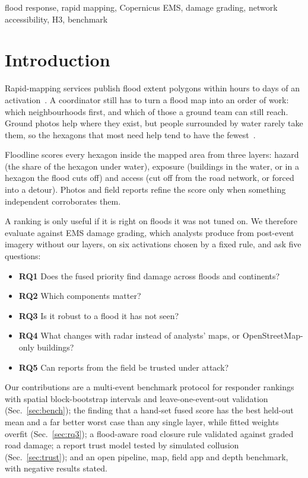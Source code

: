 \documentclass[conference]{IEEEtran}
\begin{document}
\begin{IEEEkeywords}
flood response, rapid mapping, Copernicus EMS, damage grading, network accessibility, H3, benchmark
\end{IEEEkeywords}

\section{Introduction}

Rapid-mapping services publish flood extent polygons within hours to days of an activation~\cite{cems_rapid,donezar2020validation}. A coordinator still has to turn a flood map into an order of work: which neighbourhoods first, and which of those a ground team can still reach. Ground photos help where they exist, but people surrounded by water rarely take them, so the hexagons that most need help tend to have the fewest~\cite{assumpcao2018citizen}.

Floodline scores every hexagon inside the mapped area from three layers: hazard (the share of the hexagon under water), exposure (buildings in the water, or in a hexagon the flood cuts off) and access (cut off from the road network, or forced into a detour). Photos and field reports refine the score only when something independent corroborates them.

A ranking is only useful if it is right on floods it was not tuned on. We therefore evaluate against EMS damage grading, which analysts produce from post-event imagery without our layers, on six activations chosen by a fixed rule, and ask five questions:
\begin{itemize}
\item \textbf{RQ1} Does the fused priority find damage across floods and continents?
\item \textbf{RQ2} Which components matter?
\item \textbf{RQ3} Is it robust to a flood it has not seen?
\item \textbf{RQ4} What changes with radar instead of analysts' maps, or OpenStreetMap-only buildings?
\item \textbf{RQ5} Can reports from the field be trusted under attack?
\end{itemize}

Our contributions are a multi-event benchmark protocol for responder rankings with spatial block-bootstrap intervals and leave-one-event-out validation (Sec.~\ref{sec:bench}); the finding that a hand-set fused score has the best held-out mean and a far better worst case than any single layer, while fitted weights overfit (Sec.~\ref{sec:rq3}); a flood-aware road closure rule validated against graded road damage; a report trust model tested by simulated collusion (Sec.~\ref{sec:trust}); and an open pipeline, map, field app and depth benchmark, with negative results stated.
\end{document}
